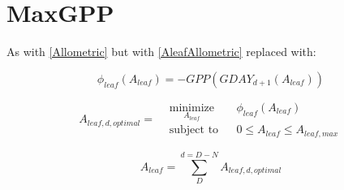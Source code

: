\chapter{MaxGPP}
As with \ref{Allometric} but with \ref{AleafAllometric} replaced with:

\begin{equation}
	\phi_{leaf}(A_{leaf}) = - GPP (GDAY_{d+1}(A_{leaf}))
\end{equation}

\begin{equation*}
A_{leaf,d,optimal}=
\begin{aligned}
& \underset{A_{leaf}}{\text{minimize}}
& & \phi_{leaf}(A_{leaf}) \\
& \text{subject to}
& & 0 \leq A_{leaf} \leq A_{leaf,max}
\end{aligned}
\end{equation*}

\begin{equation}
	A_{leaf}= \sum_{D}^{d=D-N} A_{leaf,d,optimal}
\end{equation}
